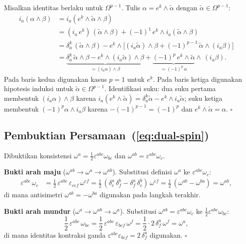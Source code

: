 \bigskip
 
Misalkan identitas berlaku untuk $\Omega^{p-1}$. Tulis $\alpha = e^k \wedge \tilde\alpha$ dengan $\tilde\alpha \in \Omega^{p-1}$:
\begin{align}
    i_a(\alpha \wedge \beta)
    &= i_a(e^k \wedge \tilde\alpha \wedge \beta) \nonumber\\[4pt]
    &= (i_a\,e^k)\,(\tilde\alpha \wedge \beta) + (-1)^1\,e^k \wedge i_a(\tilde\alpha \wedge \beta) \nonumber\\[4pt]
    &= \delta^k_a\,(\tilde\alpha \wedge \beta) - e^k \wedge \big[(i_a\tilde\alpha) \wedge \beta + (-1)^{p-1}\,\tilde\alpha \wedge (i_a\beta)\big] \nonumber\\[4pt]
    &= \underbrace{\delta^k_a\,\tilde\alpha \wedge \beta - e^k \wedge (i_a\tilde\alpha) \wedge \beta}_{\displaystyle = (i_a\alpha) \wedge \beta} + \underbrace{(-1)^p\,e^k \wedge \tilde\alpha}_{\displaystyle = (-1)^p\,\alpha} \wedge\, (i_a\beta).
\end{align}
Pada baris kedua digunakan kasus $p = 1$ untuk $e^k$. Pada baris ketiga digunakan hipotesis induksi untuk $\tilde\alpha \in \Omega^{p-1}$. Identifikasi suku: dua suku pertama membentuk $(i_a\alpha) \wedge \beta$ karena $i_a(e^k \wedge \tilde\alpha) = \delta^k_a\tilde\alpha - e^k \wedge i_a\tilde\alpha$; suku ketiga membentuk $(-1)^p\alpha \wedge i_a\beta$ karena $-(-1)^{p-1} = (-1)^p$ dan $e^k \wedge \tilde\alpha = \alpha$. $\square$
 
\subsection{Pembuktian Persamaan~(\ref{eq:dual-spin})}
\label{app:proof-spin-duality}
 
Dibuktikan konsistensi $\omega^a = \frac{1}{2}\varepsilon^{abc}\omega_{bc}$ dan $\omega^{ab} = \varepsilon^{abc}\omega_c$.
 
\bigskip\noindent\textbf{Bukti arah maju} ($\omega^{ab} \to \omega^a \to \omega^{ab}$). Substitusi definisi $\omega^a$ ke $\varepsilon^{abc}\omega_c$:
\begin{align}
    \varepsilon^{abc}\,\omega_c
    &= \frac{1}{2}\,\varepsilon^{abc}\,\varepsilon_{cef}\,\omega^{ef}
    = \frac{1}{2}\,(\delta^a_e\,\delta^b_f - \delta^a_f\,\delta^b_e)\,\omega^{ef}
    = \frac{1}{2}\,(\omega^{ab} - \omega^{ba})
    = \omega^{ab},
\end{align}
di mana antisimetri $\omega^{ab} = -\omega^{ba}$ digunakan pada langkah terakhir.
 
\bigskip\noindent\textbf{Bukti arah mundur} ($\omega^a \to \omega^{ab} \to \omega^a$). Substitusi $\omega^{ab} = \varepsilon^{abc}\omega_c$ ke $\frac{1}{2}\varepsilon^{abc}\omega_{bc}$:
\begin{equation}
    \frac{1}{2}\,\varepsilon^{abc}\,\omega_{bc}
    = \frac{1}{2}\,\varepsilon^{abc}\,\varepsilon_{bcf}\,\omega^f
    = \frac{1}{2}\cdot 2\,\delta^a_f\,\omega^f
    = \omega^a,
\end{equation}
di mana identitas kontraksi ganda $\varepsilon^{abc}\varepsilon_{bcf} = 2\,\delta^a_f$ digunakan. $\square$
 
